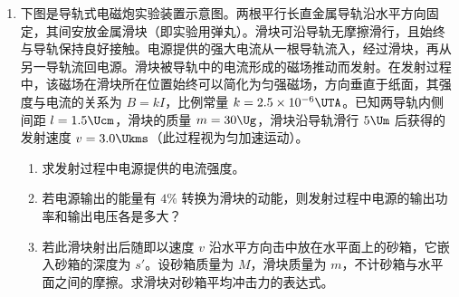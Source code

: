 \documentclass[\gkver]{gaokaozhenti}
\begin{document}
\begin{enumerate}
\item
下图是导轨式电磁炮实验装置示意图。两根平行长直金属导轨沿水平方向固定，其间安放金属滑块（即实验用弹丸）。滑块可沿导轨无摩擦滑行，且始终与导轨保持良好接触。电源提供的强大电流从一根导轨流入，经过滑块，再从另一导轨流回电源。滑块被导轨中的电流形成的磁场推动而发射。在发射过程中，该磁场在滑块所在位置始终可以简化为匀强磁场，方向垂直于纸面，其强度与电流的关系为 $B=kI$，比例常量 $k=2.5\times10^{-6}\UTA$。已知两导轨内侧间距 $l=1.5\Ucm$，滑块的质量 $m=30\Ug$，滑块沿导轨滑行 $5\Um$ 后获得的发射速度 $v=3.0\Ukms$（此过程视为匀加速运动）。
\begin{enumerate}
	\item
	求发射过程中电源提供的电流强度。
	\item
	若电源输出的能量有 $4\%$ 转换为滑块的动能，则发射过程中电源的输出功率和输出电压各是多大？
	\item
	若此滑块射出后随即以速度 $v$ 沿水平方向击中放在水平面上的砂箱，它嵌入砂箱的深度为 $s'$。设砂箱质量为 $M$，滑块质量为 $m$，不计砂箱与水平面之间的摩擦。求滑块对砂箱平均冲击力的表达式。
\end{enumerate}

\end{enumerate}
\end{document}
